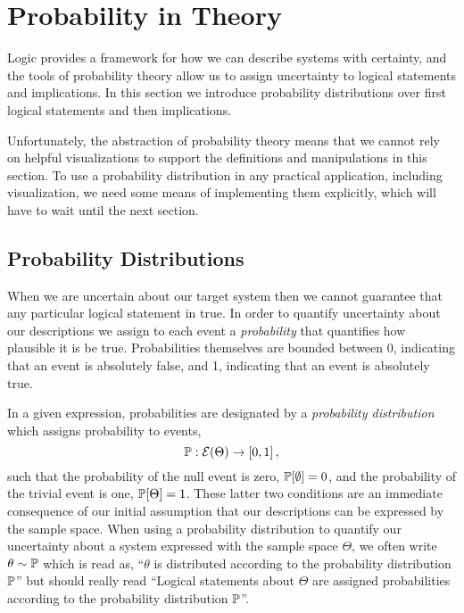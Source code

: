 \chapter{Probability in Theory}

Logic provides a framework for how we can describe systems with certainty,
and the tools of probability theory allow us to assign uncertainty to logical
statements and implications.  In this section we introduce probability
distributions over first logical statements and then implications.

Unfortunately, the abstraction of probability theory means that we cannot rely 
on helpful visualizations to support the definitions and manipulations in this
section.  To use a probability distribution in any practical application, including 
visualization, we need some means of implementing them explicitly, which will 
have to wait until the next section.

\section{Probability Distributions}

When we are uncertain about our target system then we cannot
guarantee that any particular logical statement in true.  In order to
quantify uncertainty about our descriptions we assign to each event 
a \emph{probability} that quantifies how plausible it is be true.  
Probabilities themselves are bounded between 0, indicating that an 
event is absolutely false, and 1, indicating that an event is absolutely
true.

In a given expression, probabilities are designated by a 
\emph{probability distribution} which assigns probability to events,
%
\begin{equation*}
\mathbb{P} : \mathcal{E} \! \left( \Theta \right) \rightarrow \left[0, 1 \right],
\end{equation*}
%
such that the probability of the null event is zero, 
$\mathbb{P} \! \left[ \emptyset \right] = 0$, and the probability of the trivial
event is one, $\mathbb{P} \! \left[ \Theta \right] = 1$.  These latter two conditions 
are an immediate consequence of our initial assumption that our descriptions
can be expressed by the sample space.  When using a probability distribution 
to quantify our uncertainty about a system expressed with the sample
space $\Theta$, we often write $\theta \sim \mathbb{P}$ which is read as, 
``$\theta$ is distributed according to the probability distribution $\mathbb{P}$''
but should really read ``Logical statements about $\Theta$ are assigned 
probabilities according to the probability distribution $\mathbb{P}$''.

